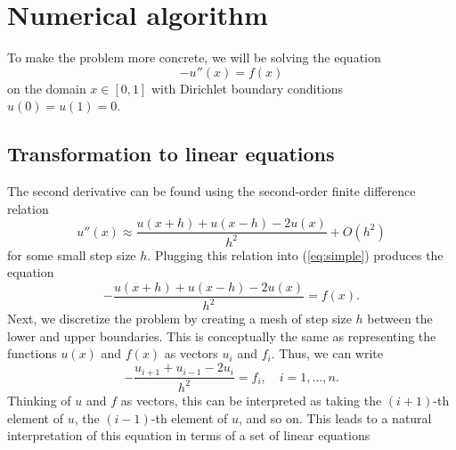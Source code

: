 \documentclass{article}
\begin{document}
\section{Numerical algorithm}

    To make the problem more concrete, we will be solving the equation
    \begin{equation}
        -u''(x) = f(x)  \label{eq:simple}
    \end{equation}
    on the domain $x \in [0, 1]$ with Dirichlet boundary conditions $u(0) = u(1) = 0$.

    \subsection{Transformation to linear equations}

        The second derivative can be found using the second-order finite difference relation
        \begin{equation}
            u''(x) \approx \frac{u(x+h) + u(x-h) - 2u(x)}{h^2} + O(h^2)  \label{eq:finite}
        \end{equation}
        for some small step size $h$. Plugging this relation into (\ref{eq:simple}) produces the equation
        \begin{equation}
            -\frac{u(x+h) + u(x-h) - 2u(x)}{h^2} = f(x).
        \end{equation}
        Next, we discretize the problem by creating a mesh of step size $h$ between the lower and upper boundaries. This is conceptually the same as representing the functions $u(x)$ and $f(x)$ as vectors $u_i$ and $f_i$. Thus, we can write
        \begin{equation}
            -\frac{u_{i+1} + u_{i-1} - 2u_i}{h^2} = f_i, \quad i = 1, \dots, n.
        \end{equation}
        Thinking of $u$ and $f$ as vectors, this can be interpreted as taking the $(i+1)$-th element of $u$, the $(i-1)$-th element of $u$, and so on. This leads to a natural interpretation of this equation in terms of a set of linear equations
\end{document}
